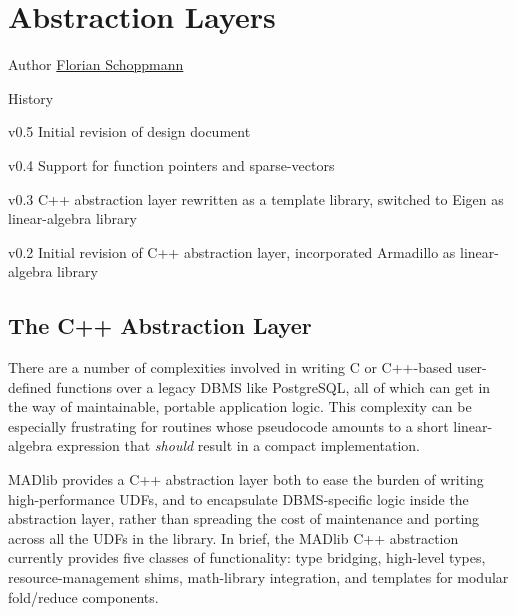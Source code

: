 
\chapter{Abstraction Layers}

\begin{moduleinfo}
\item[Author] \href{mailto:Florian.Schoppmann@emc.com}{Florian Schoppmann}
\item[History]
	\begin{modulehistory}
		\item[v0.5] Initial revision of design document
		\item[v0.4] Support for function pointers and sparse-vectors
		\item[v0.3] C++ abstraction layer rewritten as a template library, switched to Eigen \cite{eigen} as linear-algebra library
		\item[v0.2] Initial revision of C++ abstraction layer, incorporated Armadillo \cite{armadillo} as linear-algebra library
	\end{modulehistory}
\end{moduleinfo}


\section{The C++ Abstraction Layer}

There are a number of complexities involved in writing C or C++-based user-defined functions over a legacy DBMS like PostgreSQL, all of which can get in the way of maintainable, portable application logic. This complexity can be especially frustrating for routines whose pseudocode amounts to a short linear-algebra expression that \emph{should} result in a compact implementation.

MADlib provides a C++ abstraction layer both to ease the burden of writing high-performance UDFs, and to encapsulate DBMS-specific logic inside the abstraction layer, rather than spreading the cost of maintenance and porting across all the UDFs in the library. In brief, the MADlib C++ abstraction currently provides five classes of functionality: type bridging, high-level types, resource-management shims, math-library integration, and templates for modular fold/reduce components.

